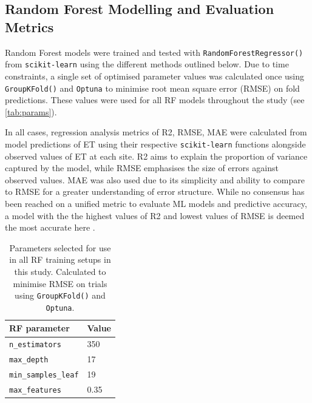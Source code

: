 \subsection{Random Forest Modelling and Evaluation Metrics}\label{sec:RF}
Random Forest models were trained and tested with \texttt{RandomForestRegressor()} from \texttt{scikit-learn} \parencite{pedregosa2011scikit} using the different methods outlined below. Due to time constraints, a single set of optimised parameter values was calculated once using \texttt{GroupKFold()} and \texttt{Optuna} \parencite{akiba2019optuna} to minimise root mean square error (RMSE) on fold predictions. These values were used for all \ac{RF} models throughout the study (see \autoref{tab:params}). 
\par In all cases, regression analysis metrics of \ac{R2}, \ac{RMSE}, \ac{MAE} were calculated from model predictions of \ac{ET} using their respective \texttt{scikit-learn} functions alongside observed values of \ac{ET} at each site. \ac{R2} aims to explain the proportion of variance captured by the model, while RMSE emphasises the size of errors against observed values. MAE was also used due to its simplicity and ability to compare to RMSE for a greater understanding of error structure. While no consensus has been reached on a unified metric to evaluate ML models and predictive accuracy, a model with the the highest values of \ac{R2} and lowest values of RMSE is deemed the most accurate here \parencite{chicco2021coefficient, liyew2025review}.


\begin{table}[H]
	\caption{\centering Parameters selected for use in all \ac{RF} training setups in this study. Calculated to minimise RMSE on trials using \texttt{GroupKFold()} and \texttt{Optuna}.}
	\centering
	\begin{tabularx}{0.5\linewidth}{l l}
		\toprule
		\ac{RF} parameter & Value \\
		\midrule
		\texttt{n\_estimators} & 350 \\
		\texttt{max\_depth} & 17 \\
		\texttt{min\_samples\_leaf} & 19 \\
		\texttt{max\_features} & 0.35  \\
	\end{tabularx}
	\label{tab:params}
\end{table}


